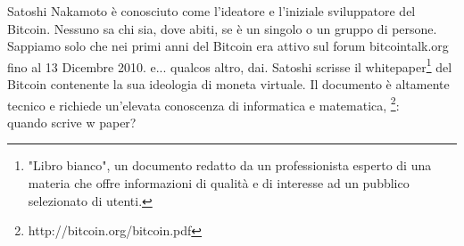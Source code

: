 \documentclass {article}
\begin{document}
Satoshi Nakamoto è conosciuto come l'ideatore e l'iniziale sviluppatore del Bitcoin.
Nessuno sa chi sia, dove abiti, se è un singolo o un gruppo di persone. Sappiamo solo che nei primi anni del Bitcoin era attivo sul forum bitcointalk.org fino al 13 Dicembre 2010. e... qualcos altro, dai.
Satoshi scrisse il whitepaper\footnote{"Libro bianco", un documento redatto da un professionista esperto di una materia che offre informazioni di qualità e di interesse ad un pubblico selezionato di utenti.} del Bitcoin contenente la sua ideologia di moneta virtuale. Il documento è altamente tecnico e richiede un'elevata conoscenza di informatica e matematica, \footnote{http://bitcoin.org/bitcoin.pdf}:\\

quando scrive w paper?




\end{document}
